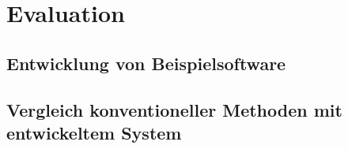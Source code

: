 \chapter{Evaluation}
\label{evaluation}


\section{Entwicklung von Beispielsoftware}
\label{entwicklung_von_beispielsoftware}


\section{Vergleich konventioneller Methoden mit entwickeltem System}
\label{vergleich_system_javafx}

